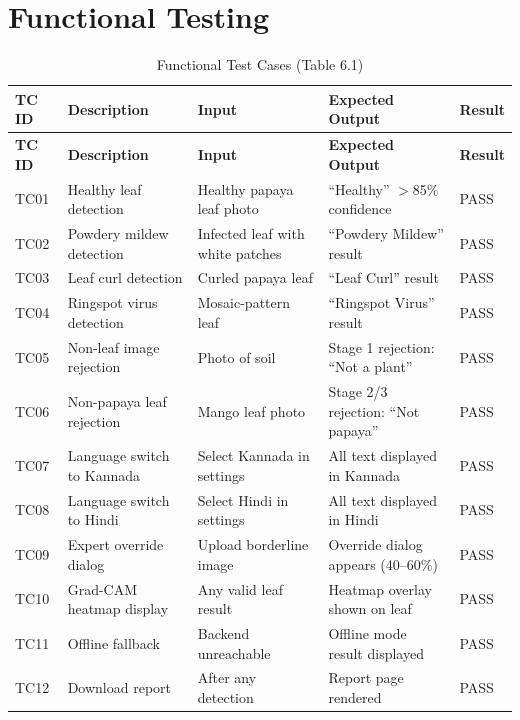 \documentclass[12pt,a4paper]{report}
\begin{document}
\section{Functional Testing}

\begin{center}
\begin{longtable}{|p{1cm}|p{3cm}|p{3cm}|p{3.2cm}|p{1.5cm}|}
\caption{Functional Test Cases (Table 6.1)}\label{tab:test_cases}\\
\hline
\textbf{TC ID} & \textbf{Description} & \textbf{Input} & \textbf{Expected Output} & \textbf{Result} \\
\hline
\endfirsthead
\hline
\textbf{TC ID} & \textbf{Description} & \textbf{Input} & \textbf{Expected Output} & \textbf{Result} \\
\hline
\endhead
TC01 & Healthy leaf detection & Healthy papaya leaf photo & ``Healthy'' $>$85\% confidence & PASS \\
\hline
TC02 & Powdery mildew detection & Infected leaf with white patches & ``Powdery Mildew'' result & PASS \\
\hline
TC03 & Leaf curl detection & Curled papaya leaf & ``Leaf Curl'' result & PASS \\
\hline
TC04 & Ringspot virus detection & Mosaic-pattern leaf & ``Ringspot Virus'' result & PASS \\
\hline
TC05 & Non-leaf image rejection & Photo of soil & Stage 1 rejection: ``Not a plant'' & PASS \\
\hline
TC06 & Non-papaya leaf rejection & Mango leaf photo & Stage 2/3 rejection: ``Not papaya'' & PASS \\
\hline
TC07 & Language switch to Kannada & Select Kannada in settings & All text displayed in Kannada & PASS \\
\hline
TC08 & Language switch to Hindi & Select Hindi in settings & All text displayed in Hindi & PASS \\
\hline
TC09 & Expert override dialog & Upload borderline image & Override dialog appears (40--60\%) & PASS \\
\hline
TC10 & Grad-CAM heatmap display & Any valid leaf result & Heatmap overlay shown on leaf & PASS \\
\hline
TC11 & Offline fallback & Backend unreachable & Offline mode result displayed & PASS \\
\hline
TC12 & Download report & After any detection & Report page rendered & PASS \\
\hline
\end{longtable}
\end{center}
\end{document}
